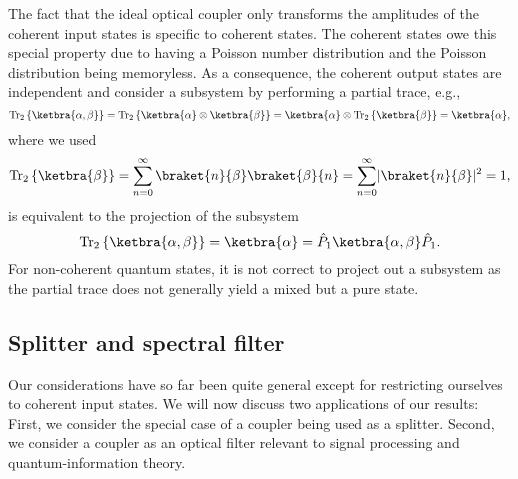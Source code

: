 The fact that the ideal optical coupler only transforms the amplitudes of the coherent input states is specific to coherent states.
The coherent states owe this special property due to having a Poisson number distribution and the Poisson distribution being memoryless.
As a consequence, the coherent output states are independent and consider a subsystem by performing a partial trace, e.g.,
\begin{equation}
	\trace_2\left\{
		\ketbra{\alpha,\beta}
	\right\}
	=
	\trace_2\left\{
		\ketbra{\alpha}
		\otimes
		\ketbra{\beta}
	\right\}
	=
	\ketbra{\alpha}
	\otimes
	\trace_2\left\{
		\ketbra{\beta}
	\right\}
	=
	\ketbra{\alpha}
	,
\end{equation}
where we used
\begin{equation}
	\trace_2\left\{
		\ketbra{\beta}
	\right\}
	=
	\sum_{n=0}^\infty
	\braket{n}{\beta}
	\braket{\beta}{n}
	=
	\sum_{n=0}^\infty
	\abs{\braket{n}{\beta}}^2
	=
	1
	,
\end{equation}
is equivalent to the projection of the subsystem
\begin{equation}
	\trace_2\left\{
		\ketbra{\alpha,\beta}
	\right\}
	=
	\ketbra{\alpha}
	=
	\hat{P}_1
	\ketbra{\alpha,\beta}
	\hat{P}_1
	.
\end{equation}
For non-coherent quantum states, it is not correct to project out a subsystem as the partial trace does not generally yield a mixed but a pure state.

\subsection{Splitter and spectral filter}

Our considerations have so far been quite general except for restricting ourselves to coherent input states.
We will now discuss two applications of our results:
First, we consider the special case of a coupler being used as a splitter. 
Second, we consider a coupler as an optical filter relevant to signal processing and quantum-information theory.

